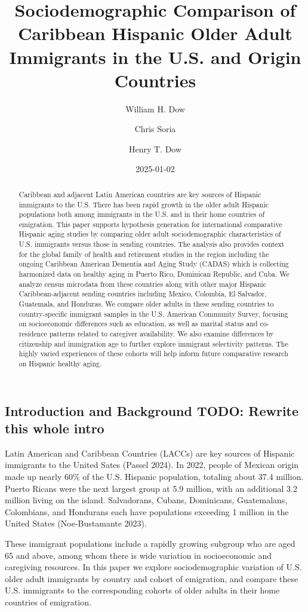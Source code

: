\documentclass[
]{article}
\title{Sociodemographic Comparison of Caribbean Hispanic Older Adult
Immigrants in the U.S. and Origin Countries}
\author{William H. Dow \and Chris Soria \and Henry T. Dow}
\date{2025-01-02}
\begin{document}
\maketitle
\begin{abstract}
Caribbean and adjacent Latin American countries are key sources of
Hispanic immigrants to the U.S. There has been rapid growth in the older
adult Hispanic populations both among immigrants in the U.S. and in
their home countries of emigration. This paper supports hypothesis
generation for international comparative Hispanic aging studies by
comparing older adult sociodemographic characteristics of U.S.
immigrants versus those in sending countries. The analysis also provides
context for the global family of health and retirement studies in the
region including the ongoing Caribbean American Dementia and Aging Study
(CADAS) which is collecting harmonized data on healthy aging in Puerto
Rico, Dominican Republic, and Cuba. We analyze census microdata from
these countries along with other major Hispanic Caribbean-adjacent
sending countries including Mexico, Colombia, El Salvador, Guatemala,
and Honduras. We compare older adults in these sending countries to
country-specific immigrant samples in the U.S. American Community
Survey, focusing on socioeconomic differences such as education, as well
as marital status and co-residence patterns related to caregiver
availability. We also examine differences by citizenship and immigration
age to further explore immigrant selectivity patterns. The highly varied
experiences of these cohorts will help inform future comparative
research on Hispanic healthy aging.
\end{abstract}


\subsection{Introduction and Background TODO: Rewrite this whole
intro}\label{sec-intro}

Latin American and Caribbean Countries (LACCs) are key sources of
Hispanic immigrants to the United Sates (Passel 2024). In 2022, people
of Mexican origin made up nearly 60\% of the U.S. Hispanic population,
totaling about 37.4 million. Puerto Ricans were the next largest group
at 5.9 million, with an additional 3.2 million living on the island.
Salvadorans, Cubans, Dominicans, Guatemalans, Colombians, and Hondurans
each have populations exceeding 1 million in the United States
(Noe-Bustamante 2023).

These immigrant populations include a rapidly growing subgroup who are
aged 65 and above, among whom there is wide variation in socioeconomic
and caregiving resources. In this paper we explore sociodemographic
variation of U.S. older adult immigrants by country and cohort of
emigration, and compare these U.S. immigrants to the corresponding
cohorts of older adults in their home countries of emigration.
\end{document}
